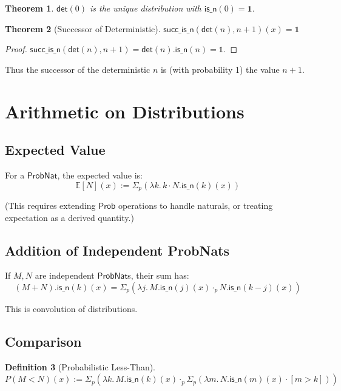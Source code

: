 \documentclass[11pt,a4paper]{article}
\newtheorem{theorem}{Theorem}[section]
\newtheorem{definition}[theorem]{Definition}
\newcommand{\Prob}{\mathsf{Prob}}
\newcommand{\ProbNat}{\mathsf{ProbNat}}
\newcommand{\E}{\mathbb{E}}
\newcommand{\pone}{\mathbb{1}}
\newcommand{\pmul}{\cdot_p}
\newcommand{\psum}{\Sigma_p}
\begin{document}
\begin{theorem}
$\mathsf{det}(0)$ is the unique distribution with $\mathsf{is\_n}(0) = \mathbf{1}$.
\end{theorem}

\begin{theorem}[Successor of Deterministic]
$\mathsf{succ\_is\_n}(\mathsf{det}(n), n+1)(x) = \pone$
\end{theorem}

\begin{proof}
$\mathsf{succ\_is\_n}(\mathsf{det}(n), n+1) = \mathsf{det}(n).\mathsf{is\_n}(n) = \pone$.
\end{proof}

Thus the successor of the deterministic $n$ is (with probability 1) the value $n+1$.

\section{Arithmetic on Distributions}

\subsection{Expected Value}

For a $\ProbNat$, the expected value is:
\[
\E[N](x) := \psum(\lambda k.\, k \cdot N.\mathsf{is\_n}(k)(x))
\]

(This requires extending $\Prob$ operations to handle naturals, or treating expectation as a derived quantity.)

\subsection{Addition of Independent ProbNats}

If $M, N$ are independent $\ProbNat$s, their sum has:
\[
(M + N).\mathsf{is\_n}(k)(x) = \psum\left(\lambda j.\, M.\mathsf{is\_n}(j)(x) \pmul N.\mathsf{is\_n}(k-j)(x)\right)
\]

This is convolution of distributions.

\subsection{Comparison}

\begin{definition}[Probabilistic Less-Than]
$P(M < N)(x) := \psum\left(\lambda k.\, M.\mathsf{is\_n}(k)(x) \pmul \psum\left(\lambda m.\, N.\mathsf{is\_n}(m)(x) \cdot [m > k]\right)\right)$
\end{definition}
\end{document}
